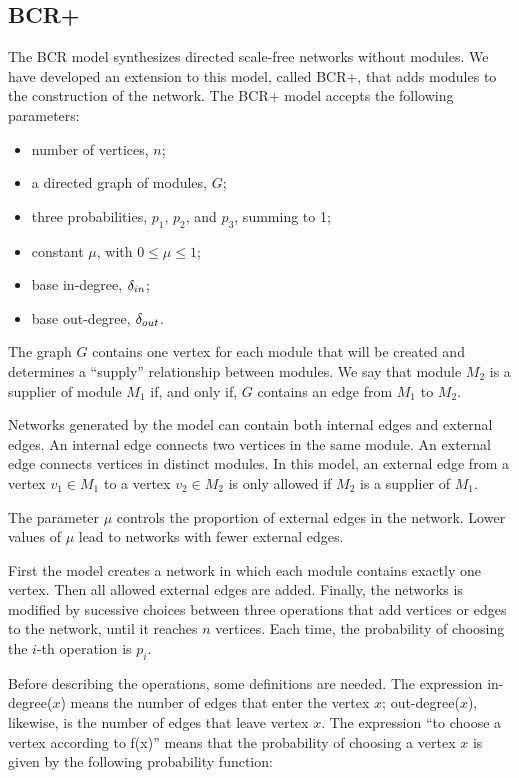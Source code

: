 \subsection{BCR+}

The BCR model \cite{Bollobas2003} synthesizes directed scale-free networks
without modules. We have developed an extension to this model, called BCR+, that
adds modules to the construction of the network. The BCR+ model accepts the
following parameters:

\begin{itemize}
\item number of vertices, $n$;
\item a directed graph of modules, $G$;
\item three probabilities, $p_1$, $p_2$, and $p_3$, summing to 1;
\item constant $\mu$, with $0 \le \mu \le 1$;
\item base in-degree, $\delta_{in}$;
\item base out-degree, $\delta_{out}$.
\end{itemize}

The graph $G$ contains one vertex for each module that will be created and
determines a ``supply'' relationship between modules. We say that module $M_2$
is a supplier of module $M_1$ if, and only if, $G$ contains an edge from $M_1$
to $M_2$.  

Networks generated by the model can contain both internal edges and external
edges. An internal edge connects two vertices in the same module. An external
edge connects vertices in distinct modules. In this model, an external edge from
a vertex $v_1 \in M_1$ to a vertex $v_2 \in M_2$ is only allowed if $M_2$ is a
supplier of $M_1$.

The parameter $\mu$ controls the proportion of external edges in the network.
Lower values of $\mu$ lead to networks with fewer external edges. 

First the model creates a network in which each module contains exactly one
vertex. Then all allowed external edges are added. Finally, the networks is
modified by sucessive choices between three operations that add vertices or
edges to the network, until it reaches $n$ vertices. Each time, the probability
of choosing the $i$-th operation is $p_i$.

Before describing the operations, some definitions are needed. The expression
in-degree($x$) means the number of edges that enter the vertex $x$;
out-degree($x$), likewise, is the number of edges that leave vertex $x$. The
expression ``to choose a vertex according to f(x)'' means that the probability
of choosing a vertex $x$ is given by the following probability function:

